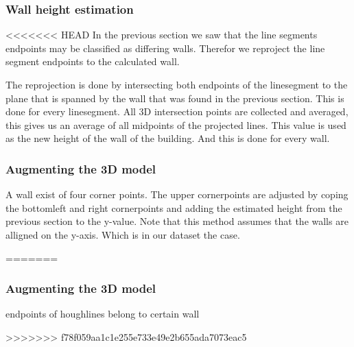 	


\subsubsection{Wall height estimation}
<<<<<<< HEAD
	In the previous section we saw that the line segments endpoints may be classified as differing walls. 
	Therefor we reproject the line segment endpoints to the calculated wall.

	The reprojection is done by intersecting both endpoints of the linesegment to the plane that is spanned by the wall that was found in the 
previous section.
	This is done for every linesegment. 
	All 3D intersection points are collected and averaged, this gives us an average of all midpoints of the projected lines.
	This value is used as the new height of the wall of the building.
	And this is done for every wall.
	

\subsubsection{Augmenting the 3D model} %
	A wall exist of four corner points. The upper cornerpoints are adjusted
	by coping the bottomleft and right cornerpoints and adding the estimated height from the previous section to the y-value.
	Note that this method assumes that the walls are alligned on the y-axis. Which is in our dataset the case.

=======

\subsubsection{Augmenting the 3D model} %



endpoints of houghlines belong to certain wall




>>>>>>> f78f059aa1c1e255e733e49e2b655ada7073eac5



